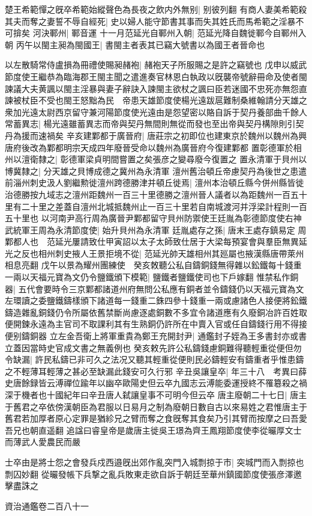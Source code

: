 楚王希範憚之旣卒希範始縱聲色為長夜之飲内外無别|{
	别彼列翻}
有商人妻美希範殺其夫而奪之妻誓不辱自經死|{
	史以婦人能守節書其事而失其姓氏而馬希範之淫暴不可揜矣}
河決鄆州|{
	鄆音運}
十一月范延光自鄆州入朝|{
	范延光降自魏徙鄆今自鄆州入朝}
丙午以閩主昶為閩國王|{
	書閩主者表其已竊大號書以為國王者晉命也}


以左散騎常侍盧損為冊禮使賜昶赭袍|{
	赭袍天子所服賜之是許之竊號也}
戊申以威武節度使王繼恭為臨海郡王閩主聞之遣進奏官林恩白執政以旣襲帝號辭冊命及使者閩諫議大夫黄諷以閩主淫暴與妻子辭訣入諫閩主欲杖之諷曰臣若迷國不忠死亦無怨直諫被杖臣不受也閩王怒黜為民　帝患天雄節度使楊光遠跋扈難制桑維翰請分天雄之衆加光遠太尉西京留守兼河陽節度使光遠由是怨望密以賂自訴于契丹養部曲千餘人常蓄異志|{
	楊光遠雖蓄異志而帝與契丹無間則無從而發也至出帝與契丹構隙則引契丹為援而速禍矣}
辛亥建鄴都于廣晉府|{
	唐莊宗之初即位也建東京於魏州以魏州為興唐府後改為鄴都明宗天成四年廢晉受命以魏州為廣晉府今復建鄴都}
置彰德軍於相州以澶衛隸之|{
	彰德軍梁貞明間嘗置之矣張彦之變尋廢今復置之}
置永清軍于貝州以博冀隸之|{
	分天雄之貝博成德之冀州為永清軍}
澶州舊治頓丘帝慮契丹為後世之患遣前淄州刺史汲人劉繼勲徙澶州跨德勝津并頓丘徙焉|{
	澶州本治頓丘縣今併州縣皆徙治德勝按九域志之澶州距魏州一百三十里德勝之澶州晉人議者以為距魏州一百五十里有二十里之差蓋自澶州北城抵魏州止一百三十里若自南城渡河并浮梁計程則一百五十里也}
以河南尹高行周為廣晉尹鄴都留守貝州防禦使王廷胤為彰德節度使右神武統軍王周為永清節度使|{
	始升貝州為永清軍}
廷胤處存之孫|{
	唐末王處存鎮易定}
周鄴都人也　范延光屢請致仕甲寅詔以太子太師致仕居于大梁每預宴會與羣臣無異延光之反也相州刺史掖人王景拒境不從|{
	范延光帥天雄相州其廵屬也掖漢縣唐帶萊州相息亮翻}
戊午以景為耀州團練使　癸亥敇聽公私自鑄銅錢無得雜以鈆鐵每十錢重一兩以天福元寶為文仍令鹽鐵頒下模範|{
	鹽鐵者鹽鐵使司也下戶嫁翻}
惟禁私作銅器|{
	五代會要時令三京鄴都諸道州府無問公私應有銅者並令鑄錢仍以天福元寶為文左環讀之委鹽鐵鑄樣頒下諸道每一錢重二銖四參十錢重一兩或慮諸色人接便將鈆鐵鑄造雜亂銅錢仍令所屬依舊禁斷尚慮逐處銅數不多宜令諸道應有久廢銅冶許百姓取便開鍊永遠為主官司不取課利其有生熟銅仍許所在中賣入官或任自鑄錢行用不得接便别鑄銅器}
立左金吾衛上將軍重貴為鄭王充開封尹|{
	通鑑封子姪為王多書封亦或書立蓋因當時史官成文書之無義例也}
癸亥敕先許公私鑄錢慮銅難得聽輕重從便但勿令缺漏|{
	許民私鑄已非可久之法况又聽其輕重從便則民必鑄輕安有鑄重者乎惟患鑄之不輕薄耳輕薄之甚必至缺漏此錢安可久行邪}
辛丑吳讓皇卒|{
	年三十八　考異曰薛史唐餘録皆云溥禪位踰年以幽卒歐陽史但云卒九國志云溥能委運授終不罹簒殺之禍深于機者也十國紀年曰辛丑唐人弑讓皇事不可明今但云卒}
唐主廢朝二十七日|{
	唐主于舊君之卒依傍漢朝臣為君服以日易月之制為廢朝日數自古以來易姓之君惟唐主于舊君若加厚者原心定罪是猶紾兄之臂而奪之食旣奪其食矣乃引其臂而按摩之曰吾愛吾兄也朝直遥翻}
追諡曰睿皇帝是歲唐主徙吳王璟為齊王鳳翔節度使李從曮厚文士而薄武人愛農民而嚴

士卒由是將士怨之會發兵戍西邉旣出郊作亂突門入城剽掠于市|{
	突城門而入剽掠也剽囚妙翻}
從曮發帳下兵撃之亂兵敗東走欲自訴于朝廷至華州鎮國節度使張彦澤邀擊盡誅之

資治通鑑卷二百八十一
